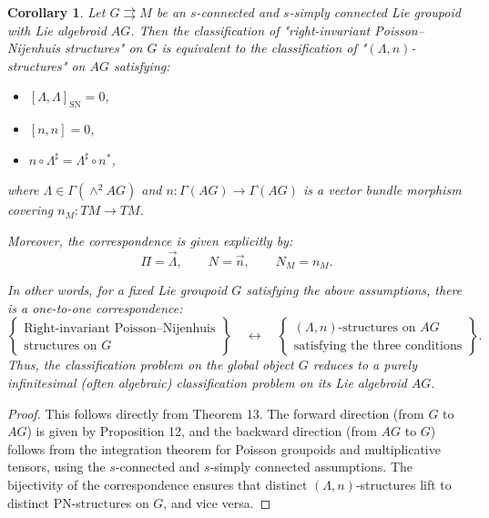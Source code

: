 \documentclass[10pt,a4paper]{amsart}
\newtheorem{corollary}{Corollary}
\newcommand{\SN}{\mathrm{SN}}
\begin{document}
\begin{corollary}
\label{cor:classification}
Let $G \rightrightarrows M$ be an $s$-connected and $s$-simply connected Lie groupoid with Lie algebroid $AG$. Then the classification of "right-invariant Poisson–Nijenhuis structures" on $G$ is equivalent to the classification of "$(\Lambda, n)$-structures" on $AG$ satisfying:
\begin{itemize}
    \item $[\Lambda, \Lambda]_{\SN} = 0$,
    \item $[n, n] = 0$,
    \item $n \circ \Lambda^{\sharp} = \Lambda^{\sharp} \circ n^{*}$,
\end{itemize}
where $\Lambda \in \Gamma(\wedge^2 AG)$ and $n: \Gamma{(AG)} \to \Gamma{(AG)}$ is a vector bundle morphism covering $n_M: TM \to TM$.

Moreover, the correspondence is given explicitly by:
\[
\Pi = \overrightarrow{\Lambda}, \qquad N = \overrightarrow{n}, \qquad N_M = n_M.
\]

In other words, for a fixed Lie groupoid $G$ satisfying the above assumptions, there is a one-to-one correspondence:
\[
\left\{
\begin{array}{c}
\text{Right-invariant Poisson--Nijenhuis} \\
\text{structures on } G
\end{array}
\right\}
\quad \longleftrightarrow \quad
\left\{
\begin{array}{c}
(\Lambda, n)\text{-structures on } AG \\
\text{satisfying the three conditions}
\end{array}
\right\}.
\]
Thus, the classification problem on the global object $G$ reduces to a purely infinitesimal (often algebraic) classification problem on its Lie algebroid $AG$.
\end{corollary}

\begin{proof}
This follows directly from Theorem 13. The forward direction (from $G$ to $AG$) is given by Proposition 12, and the backward direction (from $AG$ to $G$) follows from the integration theorem for Poisson groupoids and multiplicative tensors, using the $s$-connected and $s$-simply connected assumptions. The bijectivity of the correspondence ensures that distinct $(\Lambda, n)$-structures lift to distinct PN-structures on $G$, and vice versa.
\end{proof}
\end{document}
